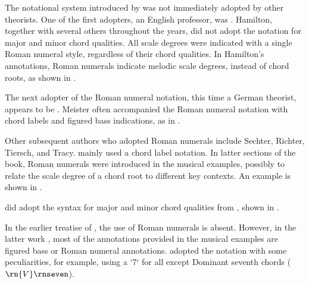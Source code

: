 

The notational system introduced by
\textcite{weber1817versuch} was not immediately adopted by
other theorists. One of the first adopters, an English
professor, was \textcite{hamilton1840catechism}. Hamilton,
together with several others throughout the years, did not
adopt the notation for major and minor chord qualities. All
scale degrees were indicated with a single Roman numeral
style, regardless of their chord qualities. In Hamilton's
annotations, Roman numerals indicate melodic scale degrees,
instead of chord roots, as shown in
.


The next adopter of the Roman numeral notation, this time a
German theorist, appears to be
\textcite{meister1852vollstandige}. Meister often
accompanied the Roman numeral notation with chord labels and
figured bass indications, as in
.


Other subsequent authors who adopted Roman numerals include
Sechter, Richter, Tiersch, and Tracy.
\textcite{sechter1853grundsatze} mainly used a chord label
notation. In latter sections of the book, Roman numerals
were introduced in the musical examples, possibly to relate
the scale degree of a chord root to different key contexts.
An example is shown in
.


\textcite{richter1860lehrbuch} did adopt the syntax for
major and minor chord qualities from
\textcite{weber1817versuch}, shown in
.

In the earlier treatise of \textcite{tiersch1868system}, the
use of Roman numerals is absent. However, in the latter work
\textcite{tiersch1874elementarbuch}, most of the annotations
provided in the musical examples are figured bass or Roman
numeral annotations. \textcite{tracy1878theory} adopted the
notation with some peculiarities, for example, using a `7`
for all except Dominant seventh chords ($\rn{V}\rnseven$).

